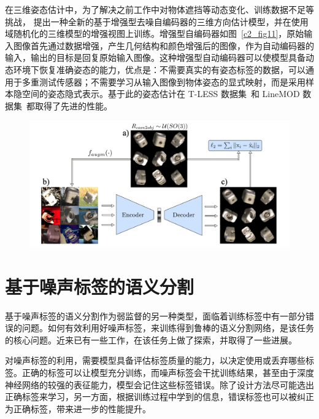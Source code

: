在三维姿态估计中，为了解决之前工作中对物体遮挡等动态变化、训练数据不足等挑战，\citet{Sundermeyer_2018_ECCV} 提出一种全新的基于增强型去噪自编码器的三维方向估计模型，并在使用域随机化的三维模型的增强视图上训练。增强型自编码器如图~\ref{c2_fig11}，原始输入图像首先通过数据增强，产生几何结构和颜色增强后的图像，作为自动编码器的输入，输出的目标是回复原始输入图像。这种增强型自动编码器可以使模型具备动态环境下恢复准确姿态的能力，优点是：不需要真实的有姿态标签的数据，可以通用于多重测试传感器；不需要学习从输入图像到物体姿态的显式映射，而是采用样本隐空间的姿态隐式表示。基于此的姿态估计在 T-LESS 数据集~\citep{hodan2017t}和 LineMOD 数据集~\citep{hinterstoisser2011multimodal}都取得了先进的性能。
    \begin{figure}[tbp]
        \centering 
        \includegraphics[width=1.0\textwidth]{img/c2/rel_b5.png}
        \label{c2_fig10}
    \end{figure}

\section{基于噪声标签的语义分割}
基于噪声标签的语义分割作为弱监督的另一种类型，面临着训练标签中有一部分错误的问题。如何有效利用好噪声标签，来训练得到鲁棒的语义分割网络，是该任务的核心问题。近来已有一些工作\citep{Zhu2019PickandLearnAQ,Xue2020CascadedRL,Zhang2020CharacterizingLE,Zhang2020RobustMI}，在该任务上做了探索，并取得了一些进展。

对噪声标签的利用，需要模型具备评估标签质量的能力，以决定使用或丢弃哪些标签。正确的标签可以让模型充分训练，而噪声标签会干扰训练结果，甚至由于深度神经网络的较强的表征能力，模型会记住这些标签错误。除了设计方法尽可能选出正确标签来学习，另一方面，根据训练过程中学到的信息，错误标签也可以被纠正为正确标签，带来进一步的性能提升。

